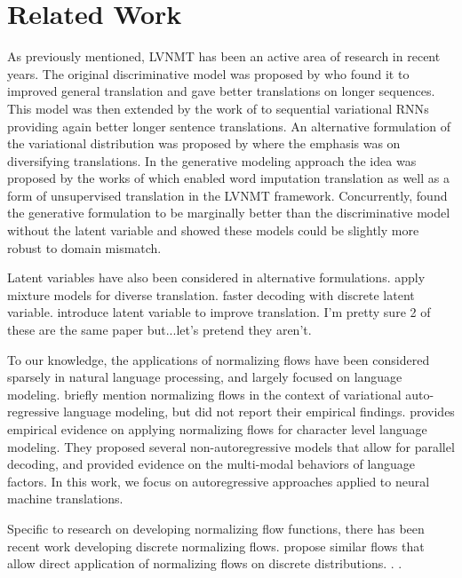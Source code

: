 \chapter{Related Work}

As previously mentioned, \ac{LVNMT} has been an active area of research in recent years. The original discriminative model was proposed by \citet{Zhang2016VNMT} who found it to improved general translation and gave better translations on longer sequences. This model was then extended by the work of \citet{Su2018VRNMT} to sequential variational \ac{RNN}s providing again better longer sentence translations. An alternative formulation of the variational distribution was proposed by \citet{schulz2018StochasticDecoder} where the emphasis was on diversifying translations. In the generative modeling approach the idea was proposed by the works of \citet{harshil2018GNMT} which enabled word imputation translation as well as a form of unsupervised translation in the \ac{LVNMT} framework. Concurrently, \citet{eikema2018AEVNMT} found the generative formulation to be marginally better than the discriminative model without the latent variable and showed these models could be slightly more robust to domain mismatch. 

Latent variables have also been considered in alternative formulations. \citet{shen2019mixturemodelsfordiverseMT} apply mixture models for diverse translation. \citet{kaiser2018DiscreteLatentVariables} faster decoding with discrete latent variable. \citet{he2018seq2seqmixturemodelforDiverseMachineTranslation} introduce latent variable to improve translation. I'm pretty sure 2 of these are the same paper but...let's pretend they aren't. 

To our knowledge, the applications of normalizing flows have been considered sparsely in natural language processing, and largely focused on language modeling. \citet{bowman2015GeneratingSent} briefly mention normalizing flows in the context of variational auto-regressive language modeling, but did not report their empirical findings. \citet{ziegler2019LatentNFforDiscrete} provides empirical evidence on applying normalizing flows for character level language modeling. They proposed several non-autoregressive models that allow for parallel decoding, and provided evidence on the multi-modal behaviors of language factors. In this work, we focus on autoregressive approaches applied to neural machine translations.

Specific to research on developing normalizing flow functions, there has been recent work developing discrete normalizing flows. \cite{tran2019discreteflows,hoogeboom2019IntegerDiscreteFlows} propose similar flows that allow direct application of normalizing flows on discrete distributions. . .




